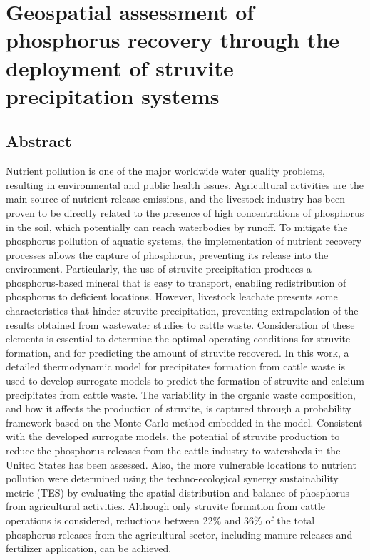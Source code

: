 \chapter{Geospatial assessment of phosphorus recovery through the deployment of struvite precipitation systems}\label{ch:Struvite}
\section*{Abstract}
Nutrient pollution is one of the major worldwide water quality problems, resulting in environmental and public health issues. Agricultural activities are the main source of nutrient release emissions, and the livestock industry has been proven to be directly related to the presence of high concentrations of phosphorus in the soil, which potentially can reach waterbodies by runoff. To mitigate the phosphorus pollution of aquatic systems, the implementation of nutrient recovery processes allows the capture of phosphorus, preventing its release into the environment. Particularly, the use of struvite precipitation produces a phosphorus-based mineral that is easy to transport, enabling redistribution of phosphorus to deficient locations. However, livestock leachate presents some characteristics that hinder struvite precipitation, preventing extrapolation of the results obtained from wastewater studies to cattle waste. Consideration of these elements is essential to determine the optimal operating conditions for struvite formation, and for predicting the amount of struvite recovered. In this work, a detailed thermodynamic model for precipitates formation from cattle waste is used to develop surrogate models to predict the formation of struvite and calcium precipitates from cattle waste. The variability in the organic waste composition, and how it affects the production of struvite, is captured through a probability framework based on the Monte Carlo method embedded in the model. Consistent with the developed surrogate models, the potential of struvite production to reduce the phosphorus releases from the cattle industry to watersheds in the United States has been assessed. Also, the more vulnerable locations to nutrient pollution were determined using the techno-ecological synergy sustainability metric (TES) by evaluating the spatial distribution and balance of phosphorus from agricultural activities. Although only struvite formation from cattle operations is considered, reductions between 22\% and 36\% of the total phosphorus releases from the agricultural sector, including manure releases and fertilizer application, can be achieved.


